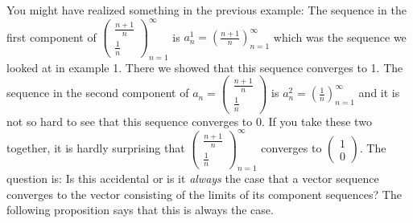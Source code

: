 \documentclass[a4paper,12pt]{article}
\theoremstyle{plain}
\begin{document}
You might have realized something in the previous example: The sequence in the first component of $\left(\begin{matrix}\frac{n+1}{n}\\ \frac{1}{n}\end{matrix}\right)_{n=1}^\infty$ is $a_n^1=\left(\frac{n+1}{n}\right)_{n=1}^\infty$ which was the sequence we looked at in example 1. There we showed that this sequence converges to 1. The sequence in the second component of $a_n=\left(\begin{matrix}\frac{n+1}{n}\\ \frac{1}{n}\end{matrix}\right)$ is $a_n^2=\left(\frac{1}{n}\right)_{n=1}^\infty$ and it is not so hard to see that this sequence converges to 0. If you take these two together, it is hardly surprising that $\left(\begin{matrix}\frac{n+1}{n}\\ \frac{1}{n}\end{matrix}\right)_{n=1}^\infty$ converges to   $\left(\begin{matrix} 1\\ 0\end{matrix}\right)$. The question is: Is this accidental or is it \emph{always} the case that a vector sequence converges to the vector consisting of the limits of its component sequences? The following proposition says that this is always the case.
\end{document}
